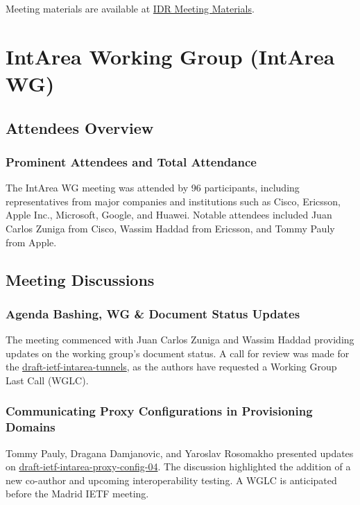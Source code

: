 \documentclass{article}
\begin{document}
Meeting materials are available at \href{https://datatracker.ietf.org/meeting/122/session/idr/}{IDR Meeting Materials}.



\newpage

\section{IntArea Working Group (IntArea WG)}

\subsection{Attendees Overview}
\subsubsection{Prominent Attendees and Total Attendance}
The IntArea WG meeting was attended by 96 participants, including representatives from major companies and institutions such as Cisco, Ericsson, Apple Inc., Microsoft, Google, and Huawei. Notable attendees included Juan Carlos Zuniga from Cisco, Wassim Haddad from Ericsson, and Tommy Pauly from Apple.

\subsection{Meeting Discussions}

\subsubsection{Agenda Bashing, WG \& Document Status Updates}
The meeting commenced with Juan Carlos Zuniga and Wassim Haddad providing updates on the working group's document status. A call for review was made for the \href{https://datatracker.ietf.org/doc/html/draft-ietf-intarea-tunnels}{draft-ietf-intarea-tunnels}, as the authors have requested a Working Group Last Call (WGLC).

\subsubsection{Communicating Proxy Configurations in Provisioning Domains}
Tommy Pauly, Dragana Damjanovic, and Yaroslav Rosomakho presented updates on \href{https://datatracker.ietf.org/doc/html/draft-ietf-intarea-proxy-config-04}{draft-ietf-intarea-proxy-config-04}. The discussion highlighted the addition of a new co-author and upcoming interoperability testing. A WGLC is anticipated before the Madrid IETF meeting.
\end{document}
